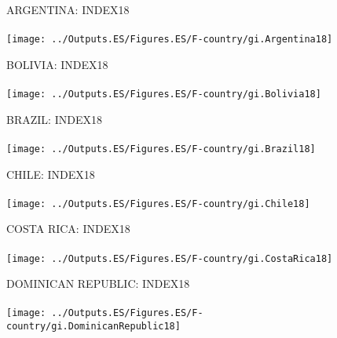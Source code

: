 \documentclass{beamer}
\begin{document}
\begin{frame}
	\begin{figure}
		\centering
		ARGENTINA: INDEX18\\~\\
		\texttt{[image: ../Outputs.ES/Figures.ES/F-country/gi.Argentina18]}
	\end{figure}
\end{frame}
%
\begin{frame}
	\begin{figure}
		\centering
		BOLIVIA: INDEX18\\~\\
		\texttt{[image: ../Outputs.ES/Figures.ES/F-country/gi.Bolivia18]}
	\end{figure}
\end{frame}
%
\begin{frame}
	\begin{figure}
		\centering
		BRAZIL: INDEX18\\~\\
		\texttt{[image: ../Outputs.ES/Figures.ES/F-country/gi.Brazil18]}
	\end{figure}
\end{frame}
%
\begin{frame}
	\begin{figure}
		\centering
		CHILE: INDEX18\\~\\
		\texttt{[image: ../Outputs.ES/Figures.ES/F-country/gi.Chile18]}
	\end{figure}
\end{frame}
%
\begin{frame}
	\begin{figure}
		\centering
		COSTA RICA: INDEX18\\~\\
		\texttt{[image: ../Outputs.ES/Figures.ES/F-country/gi.CostaRica18]}
	\end{figure}
\end{frame}
%
\begin{frame}
	\begin{figure}
		\centering
		DOMINICAN REPUBLIC: INDEX18\\~\\
		\texttt{[image: ../Outputs.ES/Figures.ES/F-country/gi.DominicanRepublic18]}
	\end{figure}
\end{frame}
\end{document}
